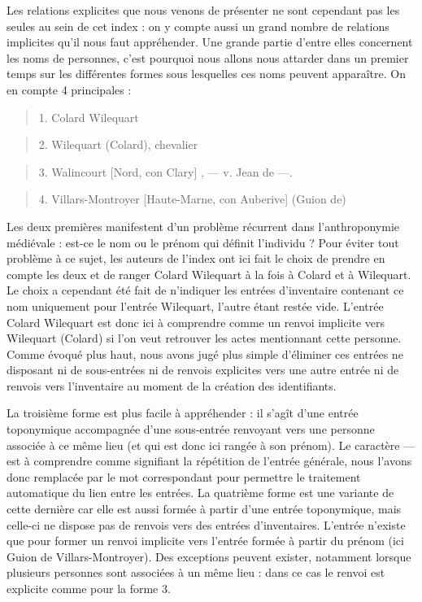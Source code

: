 \documentclass[a4paper,12pt,twoside]{book}
\begin{document}
	Les relations explicites que nous venons de présenter ne sont cependant pas les seules au sein de cet index : on y compte aussi un grand nombre de relations implicites qu'il nous faut appréhender. Une grande partie d'entre elles concernent les noms de personnes, c'est pourquoi nous allons nous attarder dans un premier temps sur les différentes formes sous lesquelles ces noms peuvent apparaître. On en compte 4 principales :
	
	\begin{quotation}
		1. Colard Wilequart
	\end{quotation}

	\begin{quotation}
		2. Wilequart (Colard), chevalier
	\end{quotation}

	\begin{quotation}
		3. Walincourt [Nord, con Clary] , — v. Jean de —.
	\end{quotation}

	\begin{quotation}
		4. Villars-Montroyer [Haute-Marne, con Auberive] (Guion	de)
	\end{quotation}
	
	\noindent Les deux premières manifestent d'un problème récurrent dans l'anthroponymie médiévale : est-ce le nom ou le prénom qui définit l'individu ? Pour éviter tout problème à ce sujet, les auteurs de l'index ont ici fait le choix de prendre en compte les deux et de ranger \og Colard Wilequart\fg{} à la fois à \og Colard\fg{} et à \og Wilequart\fg{}. Le choix a cependant été fait de n'indiquer les entrées d'inventaire contenant ce nom uniquement pour l'entrée \og Wilequart\fg{}, l'autre étant restée vide. L'entrée \og Colard Wilequart\fg{} est donc ici à comprendre comme un renvoi implicite vers \og Wilequart (Colard)\fg{} si l'on veut retrouver les actes mentionnant cette personne. Comme évoqué plus haut, nous avons jugé plus simple d'éliminer ces entrées ne disposant ni de sous-entrées ni de renvois explicites vers une autre entrée ni de renvois vers l'inventaire au moment de la création des identifiants.
	
	La troisième forme est plus facile à appréhender : il s'agît d'une entrée toponymique accompagnée d'une sous-entrée renvoyant vers une personne associée à ce même lieu (et qui est donc ici rangée à son prénom). Le caractère \og —\fg{} est à comprendre comme signifiant la répétition de l'entrée générale, nous l'avons donc remplacée par le mot correspondant pour permettre le traitement automatique du lien entre les entrées. La quatrième forme est une variante de cette dernière car elle est aussi formée à partir d'une entrée toponymique, mais celle-ci ne dispose pas de renvois vers des entrées d'inventaires. L'entrée n'existe que pour former un renvoi implicite vers l'entrée formée à partir du prénom (ici \og Guion de Villars-Montroyer\fg{}). Des exceptions peuvent exister, notamment lorsque plusieurs personnes sont associées à un même lieu : dans ce cas le renvoi est explicite comme pour la forme 3.
	
\end{document}
